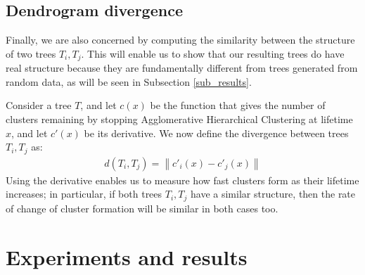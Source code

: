 \documentclass[pdftex,11pt,a4paper]{article}
\theoremstyle{definition}
\theoremstyle{remark}
\newcommand{\norm}[1]{\left\lVert#1\right\rVert}
\begin{document}
\subsection{Dendrogram divergence}
\label{subsub_divergence}
Finally, we are also concerned by computing the similarity between the structure of two trees $T_i, T_j$. This will enable us to show that our resulting trees do have real structure because they are fundamentally different from trees generated from random data, as will be seen in Subsection \ref{sub_results}.
\par Consider a tree $T$, and let $c(x)$ be the function that gives the number of clusters remaining by stopping Agglomerative Hierarchical Clustering at lifetime $x$, and let $c'(x)$ be its derivative. We now define the divergence between trees $T_i, T_j$ as:
\begin{align*}
d(T_i, T_j) = \norm{c'_i(x) - c'_j(x)}
\end{align*}
Using the derivative enables us to measure how fast clusters form as their lifetime increases; in particular, if both trees $T_i, T_j$ have a similar structure, then the rate of change of cluster formation will be similar in both cases too.

\section{Experiments and results}
\label{section_results}
\end{document}
